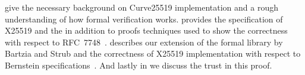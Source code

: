 give the necessary background on Curve25519
implementation and a rough understanding of how formal verification works.
 provides the specification of X25519 and the in addition to proofs
techniques used to show the correctness with respect to RFC~7748~\cite{rfc7748}.
 describes our extension of the formal library by Bartzia
and Strub and the correctness of X25519 implementation with respect to Bernstein
specifications~\cite{Ber14}.
And lastly in  we discuss the trust in this proof.



%
%
